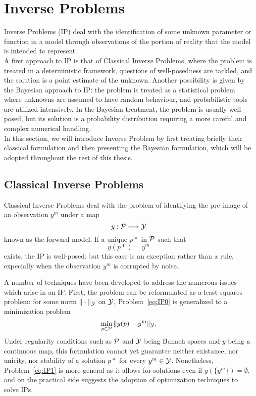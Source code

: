 \section{Inverse Problems} \label{sec:IP}
Inverse Problems (IP) deal with the identification of some unknown parameter or function in a model through observations of the portion of reality that the model is intended to represent. \\
A first approach to IP is that of Classical Inverse Problems, where the problem is treated in a deterministic framework, questions of well-posedness are tackled, and the solution is a point estimate of the unknown.
Another possibility is given by the Bayesian approach to IP: the problem is treated as a statistical problem where unknowns are assumed to have random behaviour, and probabilistic tools are utilized intensively. 
In the Bayesian treatment, the problem is usually well-posed, but its solution is a probability distribution requiring a more careful and complex numerical handling.\\
In this section, we will introduce Inverse Problem by first treating briefly their classical formulation and then presenting the Bayesian formulation, which will be adopted throughout the rest of this thesis.

\subsection{Classical Inverse Problems}\label{sec:CIP}

Classical Inverse Problems deal with the problem of identifying the pre-image of an observation $y^m$ under a map \[y : \mathcal P \longrightarrow \mathcal Y \] known as the forward model. 
If a unique $p*$ in $\mathcal P$ such that
\begin{equation}\label{eq:IP0}
    y(p*) = y^m
\end{equation}
exists, the IP is well-posed: but this case is an exception rather than a rule, expecially when the observation $y^m$ is corrupted by noise.

A number of techniques have been developed to address the numerous issues which arise in an IP.
First, the problem can be reformulated as a least squares problem: for some norm $\| \cdot \| _\mathcal Y$ on $\mathcal Y$, Problem~\ref{eq:IP0} is generalized to a minimization problem
\begin{equation}\label{eq:IP1}
    \min_{p\in \mathcal P} \| y(p) - y^m \|_\mathcal Y.
\end{equation}
Under regularity conditions such as $\mathcal P$ and $\mathcal Y$ being Banach spaces and $y$ being a continuous map, this formulation cannot yet guarantee neither existance, nor unicity, nor stability of a solution $p*$ for every $y^m \in \mathcal Y$. Nonetheless, Problem~\ref{eq:IP1} is more general as it allows for solutions even if $y(\{y^m\} )= \emptyset$, and on the practical side suggests the adoption of optimization techniques to solve IPs.

